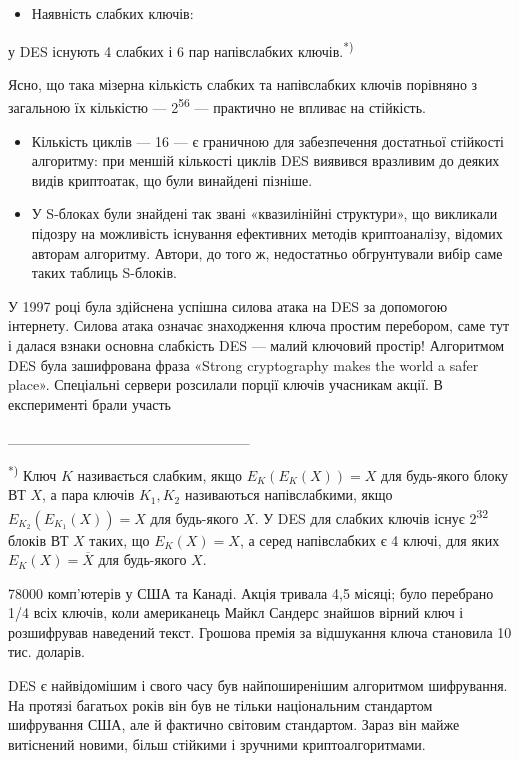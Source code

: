 \liststyleWWviiiNumxlix
\begin{itemize}
\item Наявність слабких ключів:
\end{itemize}
 у DES існують 4 слабких і 6 пар напівслабких ключів.\textsuperscript{*)}

Ясно, що така мізерна кількість слабких та напівслабких ключів порівняно з
загальною їх кількістю --- 2\textsuperscript{56} --- практично не впливає на
стійкість. 

\liststyleWWviiiNumxlix
\begin{itemize}
\item Кількість циклів --- 16 --- є граничною для забезпечення достатньої стійкості
алгоритму: при меншій кількості циклів DES виявився вразливим до деяких видів
криптоатак, що були винайдені пізніше.  
\item У S-блоках були знайдені так звані «квазилінійні структури», що викликали
підозру на можливість існування ефективних методів криптоаналізу, відомих
авторам алгоритму. Автори, до того ж, недостатньо обгрунтували вибір саме таких
таблиць S-блоків.
\end{itemize}

\bigskip

У 1997 році була здійснена успішна силова атака на DES за допомогою інтернету.
Силова атака означає знаходження ключа простим перебором, саме тут і далася
взнаки основна слабкість DES --- малий ключовий простір! Алгоритмом DES\textit{
}була зашифрована фраза «Strong cryptography makes the world a safer place».
Спеціальні сервери розсилали порції ключів учасникам акції. В експерименті
брали участь 

\_\_\_\_\_\_\_\_\_\_\_\_\_\_\_\_\_\_\_\_\_\_\_

\textsuperscript{*) }Ключ  ${K}$ називається слабким, якщо 
${E_{{K}}(E_{{K}}(X))=X}$ для будь-якого блоку ВТ  ${X}$, а пара ключів 
${K_{{1}},K_{{2}}}$ називаються напівслабкими, якщо 
${E_{{K}_{{2}}}(E_{{K}_{{1}}}(X))=X}$ для будь-якого  ${X}$. У DES для слабких
ключів існує 2\textsuperscript{32}  блоків ВТ  ${X}$ таких, що 
${E_{{K}}(X)=X}$, а серед напівслабких є 4 ключі, для яких 
${E_{{K}}(X)=\overline{{X}}}$ для будь-якого  ${X}$. 

78000 комп’ютерів у США та Канаді. Акція тривала 4,5 місяці; було перебрано 1/4
всіх ключів, коли американець Майкл Сандерс знайшов вірний ключ і розшифрував
наведений текст. Грошова премія за відшукання ключа становила 10 тис. доларів.

DES є найвідомішим і свого часу був найпоширенішим алгоритмом шифрування. На
протязі багатьох років він був не тільки національним стандартом шифрування
США, але й фактично світовим стандартом. Зараз він майже витіснений новими,
більш стійкими і зручними криптоалгоритмами.


